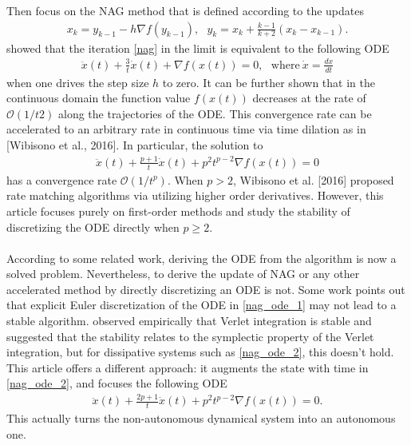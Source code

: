Then focus on the NAG method that is defined according to the updates
\begin{align}\label{nag}
  x_{k} = y_{k-1} - h \nabla f(y_{k-1}),\ \ \ y_{k} = x_{k} + \frac{k-1}{k+2} (x_{k} - x_{k-1}).
\end{align}
\textcite{JMLR:v17:15-084} showed that the iteration \eqref{nag} in the limit is equivalent to the
following ODE
\begin{align}\label{nag_ode_1}
  \ddot{x}(t) + \frac{3}{t} \dot{x}(t) + \nabla f(x(t)) = 0,\ \ \ \mathrm{where\ }
  \dot{x} = \frac{dx}{dt}
\end{align}
when one drives the step size $h$ to zero. It can be further shown that in the
continuous domain the function value $f(x(t))$ decreases at the rate of $\mathcal{O}(1/t2)$
along the trajectories of the ODE. This convergence rate can be accelerated to an
arbitrary rate in continuous time via time dilation as in [Wibisono et al., 2016].
In particular, the solution to
\begin{align}\label{nag_ode_2}
  \ddot{x}(t) + \frac{p+1}{t} \dot{x}(t) + p^{2}t^{p-2} \nabla f(x(t)) = 0
\end{align}
has a convergence rate $\mathcal{O}(1/t^{p})$. When $p > 2$, Wibisono et al. [2016] proposed rate matching
algorithms via utilizing higher order derivatives. However, this article focuses purely on
first-order methods and study the stability of discretizing the ODE directly when
$p \geq 2$.
\\\\According to some related work, deriving the ODE from the algorithm is now a solved
problem. Nevertheless, to derive the update of NAG or any other
accelerated method by directly discretizing an ODE is not. Some work points out that
explicit Euler discretization of the ODE in \eqref{nag_ode_1} may not lead to a stable
algorithm. \textcite{https://doi.org/10.48550/arxiv.1802.03653} observed empirically that Verlet
integration is stable and suggested that the stability relates to the symplectic
property of the Verlet integration, but for dissipative systems such as \eqref{nag_ode_2},
this doesn't hold. This article offers a different approach: it augments the state with
time in \eqref{nag_ode_2}, and focuses the following ODE
\begin{align}\label{nag_ode_final}
  \ddot{x}(t) + \frac{2p+1}{t} \dot{x}(t) + p^{2}t^{p-2} \nabla f(x(t)) = 0.
\end{align}
This actually turns the non-autonomous dynamical system into an autonomous one.

